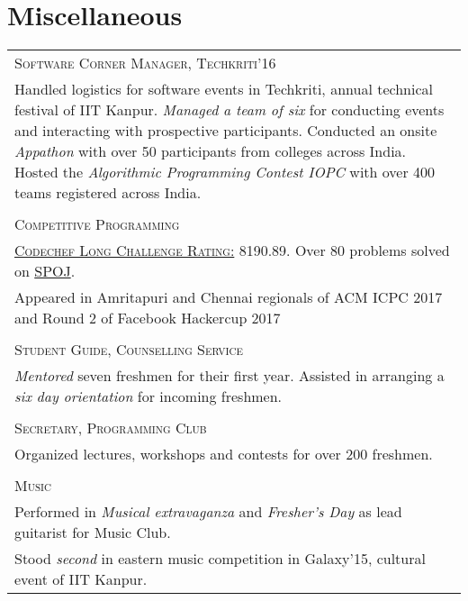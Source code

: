 \documentclass[a4paper,10pt]{article}
\begin{document}
\section{Miscellaneous}
\begin{longtable}{p{16cm}}
\large \textsc{Software Corner Manager, Techkriti'16}\\
Handled logistics for software events in Techkriti, annual technical festival of IIT Kanpur. \textit{Managed a team of six} for conducting events and interacting with prospective participants. Conducted an onsite \textit{Appathon} with over 50 participants from colleges across India. Hosted the \textit{Algorithmic Programming Contest IOPC} with over 400 teams registered across India.\\ \\
\large \textsc{Competitive Programming}\\
\href{https://www.codechef.com/users/architsh}{\textsc{Codechef Long Challenge Rating:}} 8190.89. Over 80 problems solved on \href{http://www.spoj.com/users/architsh/}{SPOJ}.\\
Appeared in Amritapuri and Chennai regionals of ACM ICPC 2017 and Round 2 of Facebook Hackercup 2017\\ \\
\pagebreak
\large \textsc{Student Guide, Counselling Service}\\
\textit{Mentored} seven freshmen for their first year. Assisted in arranging a \textit{six day orientation} for incoming freshmen.\\ \\
\large \textsc{Secretary, Programming Club}\\
Organized lectures, workshops and contests for over 200 freshmen.
\\ \\
\large \textsc{Music}\\
Performed in \textit{Musical extravaganza} and \textit{Fresher's Day} as lead guitarist for Music Club.\\
Stood \textit{second} in eastern music competition in Galaxy'15, cultural event of IIT Kanpur.
\end{longtable}
\end{document}
